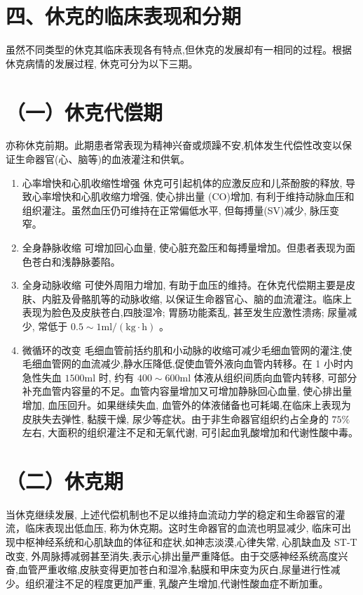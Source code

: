 \documentclass[10pt]{article}
\begin{document}
\section*{四、休克的临床表现和分期}
虽然不同类型的休克其临床表现各有特点,但休克的发展却有一相同的过程。根据休克病情的发展过程, 休克可分为以下三期。

\section*{（一）休克代偿期}
亦称休克前期。此期患者常表现为精神兴奋或烦躁不安,机体发生代偿性改变以保证生命器官(心、脑等)的血液灌注和供氧。

\begin{enumerate}
  \item 心率增快和心肌收缩性增强 休克可引起机体的应激反应和儿茶酚胺的释放, 导致心率增快和心肌收缩力增强, 使心排出量 (CO)增加, 有利于维持动脉血压和组织灌注。虽然血压仍可维持在正常偏低水平, 但每搏量(SV)减少, 脉压变窄。

  \item 全身静脉收缩 可增加回心血量, 使心脏充盈压和每搏量增加。但患者表现为面色苍白和浅静脉萎陷。

  \item 全身动脉收缩 可使外周阻力增加, 有助于血压的维持。在休克代偿期主要是皮肤、内脏及骨骼肌等的动脉收缩, 以保证生命器官心、脑的血流灌注。临床上表现为脸色及皮肤苍白,四肢湿冷; 胃肠功能紊乱, 甚至发生应激性溃疡; 尿量减少, 常低于 $0.5 \sim 1 \mathrm{ml} /(\mathrm{kg} \cdot \mathrm{h})$ 。

  \item 微循环的改变 毛细血管前括约肌和小动脉的收缩可减少毛细血管网的灌注,使毛细血管网的血流减少,静水压降低,促使血管外液向血管内转移。在 1 小时内急性失血 $1500 \mathrm{ml}$ 时, 约有 $400 \sim 600 \mathrm{ml}$ 体液从组织间质向血管内转移, 可部分补充血管内容量的不足。血管内容量增加又可增加静脉回心血量, 使心排出量增加, 血压回升。如果继续失血, 血管外的体液储备也可耗竭,在临床上表现为皮肤失去弹性, 黏膜干燥, 尿少等症状。由于非生命器官组织约占全身的 $75 \%$ 左右, 大面积的组织灌注不足和无氧代谢, 可引起血乳酸增加和代谢性酸中毒。

\end{enumerate}

\section*{（二）休克期}
当休克继续发展, 上述代偿机制也不足以维持血流动力学的稳定和生命器官的灌流，临床表现出低血压, 称为休克期。这时生命器官的血流也明显减少, 临床可出现中枢神经系统和心肌缺血的体征和症状,如神志淡漠,心律失常, 心肌缺血及 ST-T 改变, 外周脉搏减弱甚至消失,表示心排出量严重降低。由于交感神经系统高度兴奋,血管严重收缩,皮肤变得更加苍白和湿冷,黏膜和甲床变为灰白,尿量进行性减少。组织灌注不足的程度更加严重, 乳酸产生增加,代谢性酸血症不断加重。
\end{document}
